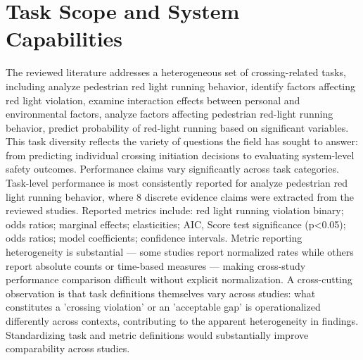\documentclass{article}
\begin{document}
\section{Task Scope and System Capabilities}
The reviewed literature addresses a heterogeneous set of crossing-related tasks, including analyze pedestrian red light running behavior, identify factors affecting red light violation, examine interaction effects between personal and environmental factors, analyze factors affecting pedestrian red-light running behavior, predict probability of red-light running based on significant variables. This task diversity reflects the variety of questions the field has sought to answer: from predicting individual crossing initiation decisions to evaluating system-level safety outcomes. Performance claims vary significantly across task categories. Task-level performance is most consistently reported for analyze pedestrian red light running behavior, where 8 discrete evidence claims were extracted from the reviewed studies. Reported metrics include: red light running violation binary; odds ratios; marginal effects; elasticities; AIC, Score test significance (p<0.05); odds ratios; model coefficients; confidence intervals. Metric reporting heterogeneity is substantial — some studies report normalized rates while others report absolute counts or time-based measures — making cross-study performance comparison difficult without explicit normalization. A cross-cutting observation is that task definitions themselves vary across studies: what constitutes a 'crossing violation' or an 'acceptable gap' is operationalized differently across contexts, contributing to the apparent heterogeneity in findings. Standardizing task and metric definitions would substantially improve comparability across studies.
\end{document}
